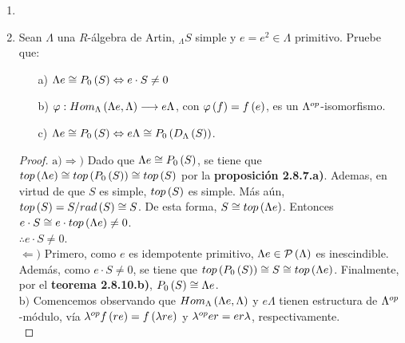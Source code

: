 \documentclass{article}
\begin{document}
\begin{enumerate}[label=\textbf{Ej \arabic*.}]
	\item 
	
	\item Sean $\Lambda$ una $R$-álgebra de Artin, $_{\Lambda}S$ simple y $e=e^{2}\in\Lambda$ primitivo. Pruebe que:
	\begin{itemize}
		\item[a)] $\Lambda e \cong P_{0}\left(S\right) \Leftrightarrow e \cdot S \neq 0$
		\item[b)] $\varphi : Hom_{\Lambda}\left(\Lambda e,\Lambda\right) \longrightarrow e \Lambda$, con $\varphi\left(f\right)=f\left(e\right)$, es un ${\Lambda}^{op}$-isomorfismo.
		\item[c)] $\Lambda e \cong P_{0}\left(S\right) \Leftrightarrow e\Lambda \cong P_{0}\left(D_{\Lambda}\left(S\right)\right)$.
	\end{itemize}
	\begin{proof}
		$\boxed{\text{a)}}\boxed{\Rightarrow )}$ Dado que $\Lambda e \cong P_{0}\left(S\right)$, se tiene que $top\left(\Lambda e\right) \cong top\left(P_{0}\left(S\right)\right) \cong top\left(S\right)$ por la \textbf{proposición 2.8.7.a)}. Ademas, en virtud de que $S$ es simple, $top\left(S\right)$ es simple. Más aún, $top\left(S\right) = S/rad\left(S\right) \cong S$. De esta forma, $S \cong top\left(\Lambda e\right)$. Entonces $e \cdot S \cong e \cdot top\left(\Lambda e\right) \neq 0$.\\
		$\therefore e \cdot S \neq 0$.\\
		
		$\boxed{\Leftarrow )}$ Primero, como $e$ es idempotente primitivo, $\Lambda e\in\mathcal{P}\left(\Lambda\right)$ es inescindible. Además, como $e \cdot S \neq 0$, se tiene que $top\left(P_{0}\left(S\right)\right) \cong S \cong top\left(\Lambda e\right)$. Finalmente, por el \textbf{teorema 2.8.10.b)}, $P_{0}\left(S\right)\cong\Lambda e$.\\
		
		$\boxed{\text{b)}}$ Comencemos observando que $Hom_{\Lambda}\left(\Lambda e,\Lambda\right)$ y $e\Lambda$ tienen estructura de ${\Lambda}^{op}$-módulo, vía ${\lambda}^{op}f\left(re\right)=f\left(\lambda re\right)$ y ${\lambda}^{op}er=er\lambda$, respectivamente.\\
		

\end{proof}
\end{enumerate}
\end{document}
